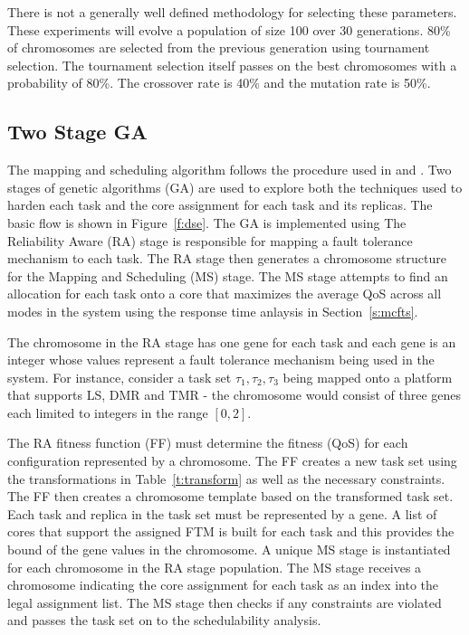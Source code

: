 	There is not a generally well defined methodology for selecting these parameters. These experiments will evolve a population of size 100 over 30 generations. 80\% of chromosomes are selected from the previous generation using tournament selection. The tournament selection itself passes on the best chromosomes with a probability of 80\%. The crossover rate is 40\% and the mutation rate is 50\%.

\subsection{Two Stage GA}
	The mapping and scheduling algorithm follows the procedure used in \cite{bolchini2013reliability} and \cite{kang2014reliability}. Two stages of genetic algorithms (GA) are used to explore both the techniques used to harden each task and the core assignment for each task and its replicas. The basic flow is shown in Figure~\ref{f:dse}. The GA is implemented using \cite{jgap}  The Reliability Aware (RA) stage is responsible for mapping a fault tolerance mechanism to each task. The RA stage then generates a chromosome structure for the Mapping and Scheduling (MS) stage. The MS stage attempts to find an allocation for each task onto a core that maximizes the average QoS across all modes in the system using the response time anlaysis in Section~\ref{s:mcfts}.
	
	
	The chromosome in the RA stage has one gene for each task and each gene is an integer whose values represent a fault tolerance mechanism being used in the system. For instance, consider a task set ${\tau_1,\tau_2,\tau_3}$ being mapped onto a platform that supports LS, DMR and TMR - the chromosome would consist of three genes each limited to integers in the range $[0,2]$. 
	
	The RA fitness function (FF) must determine the fitness (QoS) for each configuration represented by a chromosome. The FF creates a new task set using the transformations in Table~\ref{t:transform} as well as the necessary constraints. The FF then creates a chromosome template based on the transformed task set. Each task and replica in the task set must be represented by a gene. A list of cores that support the assigned FTM is built for each task and this provides the bound of the gene values in the chromosome. 
	A unique MS stage is instantiated for each chromosome in the RA stage population. The MS stage receives a chromosome indicating the core assignment for each task as an index into the legal assignment list. The MS stage then checks if any constraints are violated and passes the task set on to the schedulability analysis. 
	
